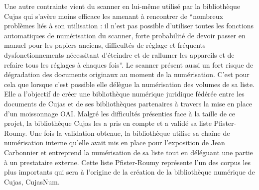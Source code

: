 Une autre contrainte vient du scanner en lui-même utilisé par la bibliothèque Cujas qui s'avère moins efficace les amenant à rencontrer de \enquote{nombreux problèmes liés à son utilisation : il n'est pas possible d'utiliser toutes les fonctions automatiques de numérisation du scanner, forte probabilité de devoir passer en manuel pour les papiers anciens, difficultés de réglage et fréquents dysfonctionnements nécessitant d'éteindre et de rallumer les appareils et de refaire tous les réglages à chaques fois}. Le scanner présent aussi un fort risque de dégradation des documents originaux au moment de la numérisation. C'est pour cela que lorsque c'est possible elle délègue la numérisation des volumes de sa liste. Elle a l'objectif de créer une bibliothèque numérique juridique fédérée entre les documents de Cujas et de ses bibliothèques partenaires à travers la mise en place d'un moissonnage OAI. Malgré les difficultés présenties face à la taille de ce projet, la bibliothèque Cujas les a pris en compte et a validé sa liste Pfister-Roumy. Une fois la validation obtenue, la bibliothèque utilise sa chaîne de numérisation interne qu'elle avait mis en place pour l'exposition de Jean Carbonnier et entreprend la numérisation de sa liste tout en déléguant une partie à un prestataire externe. Cette liste Pfister-Roumy représente l'un des corpus les plus importants qui sera à l'origine de la création de la bibliothèque numérique de Cujas, CujasNum.

